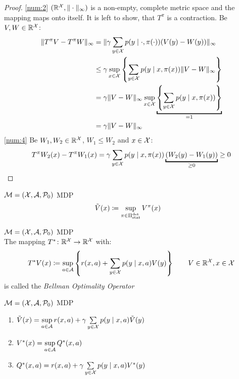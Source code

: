 \begin{proof}
\ref{num:2} \((\mathbb{R}^{\mathcal{X}}, \|\cdot\|_\infty)\) is a non-empty, complete metric space and the mapping maps onto itself. It is left to show, that \(T^\pi\) is a contraction. Be \(V,W\in\mathbb{R}^{\mathcal{X}}\):
\begin{align*}
	\|T^\pi V -T^\pi W\|_\infty &=\|\gamma\sum_{y\in\cX} p(y\mid \cdot,\pi(\cdot)) (V(y)-W(y))\|_\infty\\
	&\le\gamma \sup_{x\in\cX}\left\{ \sum_{y\in\cX} p(y\mid x,\pi(x)) \|V-W\|_\infty \right\}\\
	&=\gamma \|V-W\|_\infty  \sup_{x\in\cX}\underbracket{\left\{ \sum_{y\in\cX} p(y\mid x,\pi(x)) \right\}}_{=1}\\
	&=\gamma \|V-W\|_\infty 
\end{align*}
\ref{num:4} Be \(W_1,W_2\in\mathbb{R}^{\mathcal{X}}\), \(W_1\le W_2\) and \(x\in\mathcal{X}\):
\begin{align*}
	T^\pi W_2 (x) - T^\pi W_1(x) 
	= \gamma \sum_{y\in\cX} p(y\mid x,\pi(x)) \underbracket{(W_2(y)-W_1(y))}_{\ge 0} 
	\ge 0
\end{align*}
\end{proof}


\begin{definition}\(\mathcal{M}=(\mathcal{X},\mathcal{A},\mathcal{P}_0)\) MDP
\begin{align*}
	\tilde{V}(x)&\coloneqq \sup_{\pi\in\Pi_{\textnormal{stat}}^{\textnormal{det}}} V^\pi(x)
\end{align*}
\end{definition}


\begin{definition}\(\mathcal{M}=(\mathcal{X},\mathcal{A},\mathcal{P}_0)\) MDP\\
The mapping \(T^*\colon\mathbb{R}^{\mathcal{X}}\to\mathbb{R}^{\mathcal{X}}\) with:
	\[
	 T^* V(x)\coloneqq \sup_{a\in\mathcal{A}}\left\{r(x,a)+\sum_{y\in\mathcal{X}}p(y\mid x,a) V(y)\right\} \qquad V\in\mathbb{R}^{\mathcal{X}}, x\in\mathcal{X}
	\]
is called the \emph{Bellman Optimality Operator}
\end{definition}


\begin{lemma}\label{V*,Q* relation}\(\mathcal{M}=(\mathcal{X},\mathcal{A},\mathcal{P}_0)\) MDP
\begin{enumerate}[label=\textbf{(\roman*)},font=\normalfont]
\item\label{i:1} \(\tilde{V}(x)=\sup\limits_{a\in\mathcal{A}} r(x,a)+\gamma\sum\limits_{y\in\mathcal{X}}p(y\mid x,a)\tilde{V}(y) \)
\item\label{i:3} \(V^*(x)=\sup\limits_{a\in\mathcal{A}}Q^*(x,a)\)
\item\label{i:4} \(Q^*(x,a)=r(x,a)+\gamma \sum\limits_{y\in\mathcal{X}}p(y\mid x,a) V^*(y)\)
\end{enumerate}
\end{lemma}

